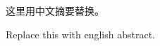 \begin{cabstract}
这里用中文摘要替换。
\end{cabstract}


\begin{eabstract} 
Replace this with english abstract.
\end{eabstract}

